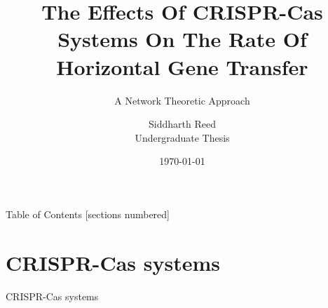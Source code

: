 \documentclass[dvipsnames]{beamer}
\title{The Effects Of CRISPR-Cas Systems On\newline
        The Rate Of Horizontal Gene Transfer}
\subtitle{\vspace{0.1in} A Network Theoretic Approach}
\date{\today}
\author{Siddharth Reed\\
        Undergraduate Thesis}
\institute{Golding Lab,\\
           Biology Department,\\
           McMaster University
}
\begin{document}
\watermarkoff %
\begin{frame}[t,plain]
    \titlepage
\end{frame}
\begin{frame}{Table of Contents}
  [sections numbered]
  \tableofcontents[hideallsubsections]
\end{frame}
\section{CRISPR-Cas systems}
\begin{frame}{}
    \begin{center}
        \Huge \textcolor{OliveGreen}{CRISPR-Cas systems}
    \end{center}
\end{frame}
\end{document}
